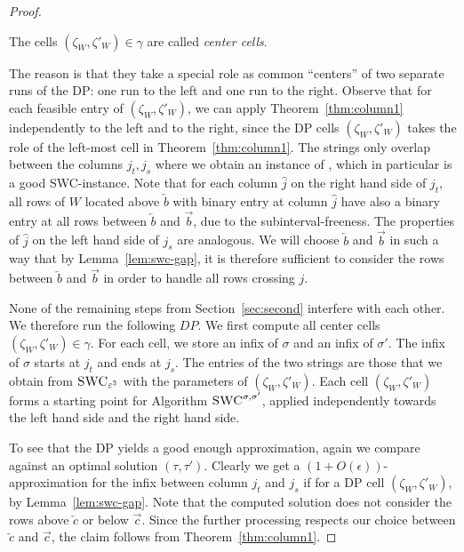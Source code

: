 \begin{proof}
    \begin{definition}
        The cells $(\zeta_W,\zeta'_W) \in \gamma$ are called \emph{center cells}.
        \label{def:center-cells}
    \end{definition}
    The reason is that they take a special role as common ``centers'' of two separate runs of the DP: one run to the left and one run to the right.
    Observe that for each feasible entry of $(\zeta_W,\zeta'_W)$, we can apply Theorem~\ref{thm:column1} independently to the left and to the right, since the DP cells $(\zeta_W,\zeta'_W)$ takes the role of the left-most cell in Theorem~\ref{thm:column1}.
    The strings only overlap between the columns $j_t,j_s$ where we obtain an instance of \BMEC, which in particular is a good SWC-instance.
    Note that for each column $\hat{j}$ on the right hand side of $j_t$, all rows of $W$ located above $\overleftarrow{b}$ with binary entry at column $\hat{j}$  have also a binary entry at all rows between $\overleftarrow{b}$ and $\overrightarrow{b}$, due to the subinterval-freeness. 
    The properties of $\hat{j}$ on the left hand side of $j_s$ are analogous.
    We will choose $\overleftarrow{b}$ and $\overrightarrow{b}$ in such a way that by Lemma~\ref{lem:swc-gap}, it is therefore sufficient to consider the rows between $\overleftarrow{b}$ and $\overrightarrow{b}$ in order to handle all rows crossing $j$.

    None of the remaining steps from Section~\ref{sec:second} interfere with each other.
    We therefore run the following $DP$.
    We first compute all center cells $(\zeta_W,\zeta'_W) \in \gamma$.
    For each cell, we store an infix of $\sigma$ and an infix of $\sigma'$.
    The infix of $\sigma$ starts at $j_t$ and ends at $j_s$.
    The entries of the two strings are those that we obtain from $\textsc{SWC}_{\varepsilon^3}$ with the parameters of $(\zeta_W,\zeta'_W)$.
    Each cell $(\zeta_W,\zeta'_W)$ forms a starting point for Algorithm $\textsc{SWC}^{\sigma, \sigma'}$, applied independently towards the left hand side and the right hand side.

    To see that the DP yields a good enough approximation, again we compare against an optimal solution $(\tau,\tau')$.
    Clearly we get a $(1+O(\epsilon))$-approximation for the infix between column $j_t$ and $j_s$ if for a DP cell $(\zeta_W,\zeta'_W)$, by Lemma~\ref{lem:swc-gap}.
    Note that the computed solution does not consider the rows above $\overleftarrow{c}$ or below $\overrightarrow{c}$.
    Since the further processing respects our choice between $\overleftarrow{c}$ and $\overrightarrow{c}$, the claim follows from Theorem~\ref{thm:column1}. 
\end{proof}

